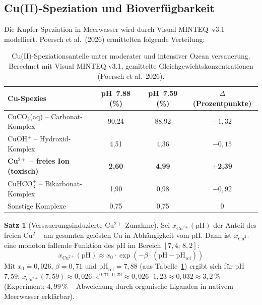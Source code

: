 ﻿\documentclass[12pt,a4paper]{article}
\theoremstyle{definition}
\newtheorem{satz}{Satz}
\theoremstyle{remark}
\begin{document}
\subsection{Cu(II)-Speziation und Bioverfügbarkeit}
\label{subsec:cu_speziation}

Die Kupfer-Speziation in Meerwasser wird durch Visual MINTEQ~v3.1 modelliert.
Poersch et al.\ (2026) ermittelten folgende Verteilung:

\begin{table}[H]
  \centering
  \caption{Cu(II)-Speziationsanteile unter moderater und intensiver Ozean\-
           versauerung. Berechnet mit Visual MINTEQ v3.1, gemittelte
           Gleichgewichtskonzentrationen (Poersch et al.\ 2026).}
  \label{tab:cu_speziation}
  \begin{tabular}{lccc}
    \toprule
    Cu-Spezies & pH~7.88 (\%) & pH~7.59 (\%) & $\Delta$ (Prozentpunkte) \\
    \midrule
    CuCO$_3$(aq) -- Carbonat-Komplex     & 90{,}24 & 88{,}92 & $-1{,}32$ \\
    CuOH$^+$ -- Hydroxid-Komplex         & 4{,}51  & 4{,}36  & $-0{,}15$ \\
    \textbf{Cu$^{2+}$ -- freies Ion (toxisch)} & \textbf{2{,}60}  & \textbf{4{,}99}  & \textbf{$+$2{,}39} \\
    CuHCO$_3^+$ -- Bikarbonat-Komplex    & 1{,}90  & 0{,}98  & $-0{,}92$ \\
    Sonstige Komplexe                     & 0{,}75  & 0{,}75  & $0$ \\
    \bottomrule
  \end{tabular}
\end{table}

\begin{satz}[Versauerungsinduzierte Cu$^{2+}$-Zunahme]
\label{satz:cu_increase}
Sei $x_{\text{Cu}^{2+}}(\text{pH})$ der Anteil des freien Cu$^{2+}$ am
gesamten gel\"osten Cu in Abh\"angigkeit vom pH. Dann ist
$x_{\text{Cu}^{2+}}$ eine monoton fallende Funktion des pH im Bereich
$[7{,}4;\, 8{,}2]$:
\begin{equation}
  x_{\text{Cu}^{2+}}(\text{pH}) \approx
  x_0 \cdot \exp\left(-\beta \cdot (\text{pH} - \text{pH}_{\text{ref}})\right)
  \label{eq:cu_speciation_model}
\end{equation}
Mit $x_0 = 0{,}026$, $\beta = 0{,}71$ und $\text{pH}_{\text{ref}} = 7{,}88$
(aus Tabelle~\ref{tab:cu_speziation}) ergibt sich f\"ur pH~$7{,}59$:
$x_{\text{Cu}^{2+}}(7{,}59) \approx 0{,}026 \cdot e^{0{,}71 \cdot 0{,}29}
\approx 0{,}026 \cdot 1{,}23 \approx 0{,}032 \approx 3{,}2\,\%$
(Experiment: $4{,}99\,\%$ -- Abweichung durch organische Liganden in nativem
Meerwasser erkl\"arbar).
\end{satz}
\end{document}
